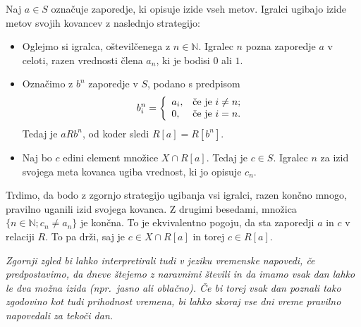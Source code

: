 \documentclass[11pt,paper=b5,footinclude,headinclude]{scrbook} %
\begin{document}
\medskip
Naj $a\in S$ označuje zaporedje, ki opisuje izide vseh metov.
Igralci ugibajo izide metov svojih kovancev z naslednjo strategijo:
  \begin{itemize}
 \item Oglejmo si igralca, oštevilčenega z $n\in \mathbb{N}$.
  Igralec $n$ pozna zaporedje $a$ v celoti, razen vrednosti člena $a_n$, ki je bodisi $0$ ali $1$.
  \item Označimo z $b^n$ zaporedje v $S$, podano s predpisom
  $$b^n_i = \left\{
               \begin{array}{ll}
                 a_i, & \hbox{\v ce je $i\neq n$;} \\
                 0, & \hbox{\v ce je $i = n$.}
               \end{array}
             \right.
  $$
  Tedaj je $aRb^n$, od koder sledi $R[a] = R[b^n]$.
  \item Naj bo $c$ edini element množice $X\cap R[a]$.
Tedaj je $c\in S$. Igralec $n$ za izid svojega meta kovanca ugiba vrednost, ki jo opisuje $c_n$.
\end{itemize}

\medskip
Trdimo, da bodo z zgornjo strategijo ugibanja vsi igralci, razen končno mnogo, pravilno uganili izid svojega kovanca.
Z drugimi besedami, množica $\{n\in \mathbb{N}; c_n\neq a_n\}$ je končna.
To je ekvivalentno pogoju, da sta zaporedji $a$ in $c$ v relaciji $R$. To pa drži, saj je $c\in X\cap R[a]$ in torej $c\in R[a]$.

\bigskip
\bigskip
\emph{ Zgornji zgled bi lahko interpretirali tudi v jeziku vremenske napovedi, če predpostavimo, da dneve štejemo z naravnimi števili in
da imamo vsak dan lahko le dva možna izida (npr.~jasno ali oblačno). Če bi torej vsak dan poznali tako zgodovino kot
tudi prihodnost vremena, bi lahko skoraj vse dni vreme pravilno napovedali za tekoči dan.}
\end{document}
